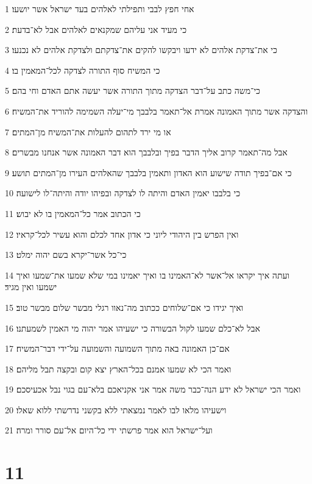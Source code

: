 \par 1 אחי חפץ לבבי ותפילתי לאלהים בעד ישראל אשר יושעו׃
\par 2 כי מעיד אני עליהם שמקנאים לאלהים אבל לא־בדעת׃
\par 3 כי את־צדקת אלהים לא ידעו ויבקשו להקים את־צדקתם ולצדקת אלהים לא נכנעו׃
\par 4 כי המשיח סוף התורה לצדקה לכל־המאמין בו׃
\par 5 כי־משה כתב על־דבר הצדקה מתוך התורה אשר יעשה אתם האדם וחי בהם׃
\par 6 והצדקה אשר מתוך האמונה אמרת אל־תאמר בלבבך מי־יעלה השמימה להוריד את־המשיח׃
\par 7 או מי ירד לתהום להעלות את־המשיח מן־המתים׃
\par 8 אבל מה־תאמר קרוב אליך הדבר בפיך ובלבבך הוא דבר האמונה אשר אנחנו מבשרים׃
\par 9 כי אם־בפיך תודה שישוע הוא האדון ותאמין בלבבך שהאלהים העירו מן־המתים תושע׃
\par 10 כי בלבבו יאמין האדם והיתה לו לצדקה ובפיהו יודה והיתה־לו לישועה׃
\par 11 כי הכתוב אמר כל־המאמין בו לא יבוש׃
\par 12 ואין הפרש בין היהודי ליוני כי אדון אחד לכלם והוא עשיר לכל־קראיו׃
\par 13 כי־כל אשר־יקרא בשם יהוה ימלט׃
\par 14 ועתה איך יקראו אל־אשר לא־האמינו בו ואיך יאמינו במי שלא שמעו את־שמעו ואיך ישמעו ואין מגיד׃
\par 15 ואיך יגידו כי אם־שלוחים ככתוב מה־נאוו רגלי מבשר שלום מבשר טוב׃
\par 16 אבל לא־כלם שמעו לקול הבשורה כי ישעיהו אמר יהוה מי האמין לשמעתנו׃
\par 17 אם־כן האמונה באה מתוך השמועה והשמועה על־ידי דבר־המשיח׃
\par 18 ואמר הכי לא שמעו אמנם בכל־הארץ יצא קום ובקצה תבל מליהם׃
\par 19 ואמר הכי ישראל לא ידע הנה־כבר משה אמר אני אקניאכם בלא־עם בגוי נבל אכעיסכם׃
\par 20 וישעיהו מלאו לבו לאמר נמצאתי ללא בקשני נדרשתי ללוא שאלו׃
\par 21 ועל־ישראל הוא אמר פרשתי ידי כל־היום אל־עם סורר ומרה׃

\chapter{11}

